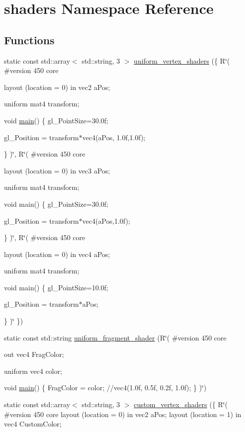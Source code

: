 \hypertarget{namespaceshaders}{}\section{shaders Namespace Reference}
\label{namespaceshaders}
\subsection*{Functions}
\begin{DoxyCompactItemize}
\item 
static const std\+::array$<$ std\+::string, 3 $>$ \mbox{\hyperlink{namespaceshaders_a14e65ed0b380c99c27347214aa2f1844}{uniform\+\_\+vertex\+\_\+shaders}} (\{ R\char`\"{}(
\#version 450 core

layout (location = 0) in vec2 a\+Pos;

uniform mat4 transform;

void \mbox{\hyperlink{gtest__tests_8cpp_a3c04138a5bfe5d72780bb7e82a18e627}{main}}()
\{
gl\+\_\+\+Point\+Size=30.\+0f;

gl\+\_\+\+Position = transform$\ast$vec4(a\+Pos, 1.\+0f,1.\+0f);

\}
)\char`\"{}, R\char`\"{}(
\#version 450 core

layout (location = 0) in vec3 a\+Pos;

uniform mat4 transform;

void main()
\{
gl\+\_\+\+Point\+Size=30.\+0f;

gl\+\_\+\+Position = transform$\ast$vec4(a\+Pos,1.\+0f);

\}
)\char`\"{}, R\char`\"{}(
\#version 450 core

layout (location = 0) in vec4 a\+Pos;

uniform mat4 transform;

void main()
\{
gl\+\_\+\+Point\+Size=10.\+0f;

gl\+\_\+\+Position = transform$\ast$a\+Pos;

\}
)\char`\"{} \})
\item 
static const std\+::string \mbox{\hyperlink{namespaceshaders_a08247b475f67d2c839a8d1fe5124b569}{uniform\+\_\+fragment\+\_\+shader}} (R\char`\"{}(
\#version 450 core

out vec4 Frag\+Color;

uniform vec4 color;

void \mbox{\hyperlink{gtest__tests_8cpp_a3c04138a5bfe5d72780bb7e82a18e627}{main}}()
\{
Frag\+Color = color; //vec4(1.\+0f, 0.\+5f, 0.\+2f, 1.\+0f);
\}
)\char`\"{})
\item 
static const std\+::array$<$ std\+::string, 3 $>$ \mbox{\hyperlink{namespaceshaders_aaad8fe3689b4c2c8c80d89acf3a2c830}{custom\+\_\+vertex\+\_\+shaders}} (\{ R\char`\"{}(
\#version 450 core
layout (location = 0) in vec2 a\+Pos;
layout (location = 1) in vec4 Custom\+Color;


\end{DoxyCompactItemize}
